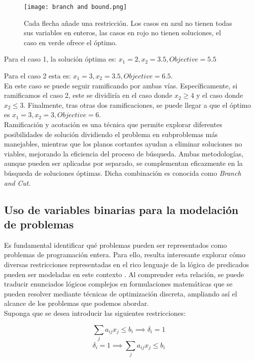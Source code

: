 \documentclass[12pt]{report}
\begin{document}
\begin{figure}[ht]
    \centering
    \texttt{[image: branch and bound.png]}
    \caption{Cada flecha añade una restricción. Los casos en azul no tienen todas sus variables en enteros, las casos en rojo no tienen soluciones, el caso en verde ofrece el óptimo.}
    \label{fig:branch and bound}
\end{figure}

Para el caso 1, la solución óptima es: $x_1=2, x_2=3.5, Objective=5.5$

Para el caso 2 esta es: $x_1=3, x_2=3.5, Objective=6.5$.\\

En este caso se puede seguir ramificando por ambas vías. Específicamente, si ramificamos el caso 2, este se dividiría en el caso donde $x_2\geq 4$ y el caso donde $x_2\leq 3$. Finalmente, tras otras dos ramificaciones, se puede llegar a que el óptimo es $x_1=3, x_2=3, Objective=6$.\\

Ramificación y acotación es una técnica que permite explorar diferentes posibilidades de solución dividiendo el problema en subproblemas más manejables, mientras que los planos cortantes ayudan a eliminar soluciones no viables, mejorando la eficiencia del proceso de búsqueda. Ambas metodologías, aunque pueden ser aplicadas por separado, se complementan eficazmente en la búsqueda de soluciones óptimas. Dicha combinación es conocida como \textit{Branch and Cut}. \cite{Byc} 

\subsection{Uso de variables binarias para la modelación de problemas}


Es fundamental identificar qué problemas pueden ser representados como problemas de programación entera. Para ello, resulta interesante explorar cómo diversas restricciones representadas en el rico lenguaje de la lógica de predicados pueden ser modeladas en este contexto \cite{Williams}. Al comprender esta relación, se puede traducir enunciados lógicos complejos en formulaciones matemáticas que se pueden resolver mediante técnicas de optimización discreta, ampliando así el alcance de los problemas que podemos abordar.\\

Suponga que se desea introducir las siguientes restricciones:

$$ \sum_j a_{ij}x_j \leq  b_i \implies  \delta_i = 1$$
$$  \delta_i = 1 \implies  \sum_j a_{ij}x_j \leq  b_i$$
\end{document}
